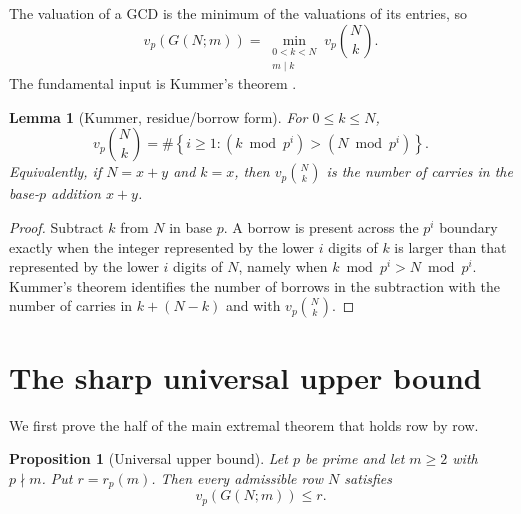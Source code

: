 \documentclass[11pt]{article}
\newtheorem{proposition}[theorem]{Proposition}
\newtheorem{lemma}[theorem]{Lemma}
\theoremstyle{definition}
\theoremstyle{remark}
\begin{document}
The valuation of a GCD is the minimum of the valuations of its entries, so
\begin{equation}\label{eq:gcdmin}
  v_p(G(N;m))
  =\min_{\substack{0<k<N\\m\mid k}}v_p\binom Nk.
\end{equation}
The fundamental input is Kummer's theorem \cite{Kummer1852,Granville1997}.

\begin{lemma}[Kummer, residue/borrow form]\label{lem:kummer-residue}
For $0\le k\le N$,
\[
  v_p\binom Nk
  =\#\left\{i\ge1:(k\bmod p^i)>(N\bmod p^i)\right\}.
\]
Equivalently, if $N=x+y$ and $k=x$, then $v_p\binom Nk$ is the number of carries in the base-$p$ addition $x+y$.
\end{lemma}

\begin{proof}
Subtract $k$ from $N$ in base $p$. A borrow is present across the $p^i$ boundary exactly when the integer represented by the lower $i$ digits of $k$ is larger than that represented by the lower $i$ digits of $N$, namely when $k\bmod p^i>N\bmod p^i$. Kummer's theorem identifies the number of borrows in the subtraction with the number of carries in $k+(N-k)$ and with $v_p\binom Nk$.
\end{proof}

\section{The sharp universal upper bound}\label{sec:upper}

We first prove the half of the main extremal theorem that holds row by row.

\begin{proposition}[Universal upper bound]\label{prop:upper}
Let $p$ be prime and let $m\ge2$ with $p\nmid m$. Put $r=r_p(m)$. Then every admissible row $N$ satisfies
\[
  v_p(G(N;m))\le r.
\]
\end{proposition}
\end{document}

